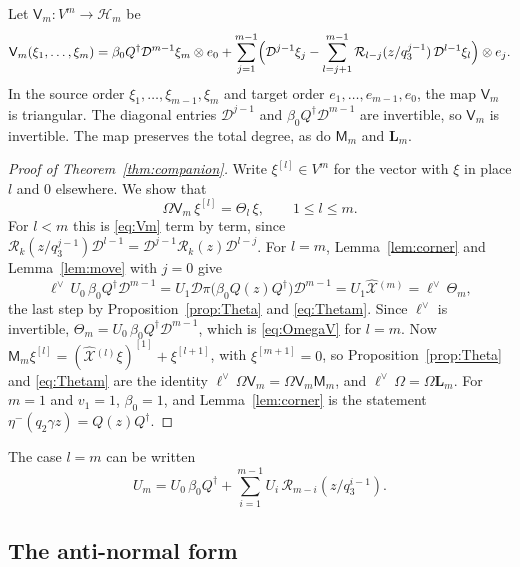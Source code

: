 \documentclass[11pt]{amsart}
\theoremstyle{definition}
\theoremstyle{remark}
\newcommand{\betaz}{\beta_0}                     %
\newcommand{\HH}{\mathcal H}
\newcommand{\Hsp}[1]{\HH_{#1}}                   %
\newcommand{\auxe}[1]{e_{#1}}                    %
\newcommand{\taut}{\ell}                         %
\newcommand{\dtaut}{\taut^{\vee}}                %
\newcommand{\Omap}{\Omega}                       %
\newcommand{\LL}{\mathbf L}
\newcommand{\Lax}[1]{\LL_{#1}}                   %
\newcommand{\DD}{\mathcal D}
\newcommand{\Xhat}[1]{\widehat{\mathcal X}{}^{(#1)}}   %
\newcommand{\MM}{\mathsf M}
\newcommand{\Miura}[1]{\MM_{#1}}                 %
\newcommand{\VV}{\mathsf V}
\newcommand{\Vconj}[1]{\VV_{#1}}                 %
\newcommand{\Rlast}[1]{\mathcal R_{#1}}          %
\newcommand{\Qcr}{Q}                             %
\newcommand{\Qan}{Q^\dagger}                     %
\begin{document}
Let \(\Vconj{m}\colon V^m\to\Hsp{m}\) be
\begin{equation}\label{eq:Vm}
 \Vconj{m}(\xi_1,\dots,\xi_m)=\betaz\Qan\DD^{m-1}\xi_m\otimes\auxe{0}
 +\sum_{j=1}^{m-1}\Bigl(\DD^{j-1}\xi_j-\sum_{l=j+1}^{m-1}
 \Rlast{l-j}(z/q_3^{j-1})\,\DD^{l-1}\xi_l\Bigr)\otimes\auxe{j}.
\end{equation}
In the source order \(\xi_1,\dots,\xi_{m-1},\xi_m\) and target order
\(\auxe{1},\dots,\auxe{m-1},\auxe{0}\), the map \(\Vconj{m}\) is triangular.
The diagonal entries \(\DD^{j-1}\) and \(\betaz\Qan\DD^{m-1}\) are invertible,
so \(\Vconj{m}\) is invertible. The map preserves the total degree, as do
\(\Miura{m}\) and \(\Lax{m}\).

\begin{proof}[Proof of Theorem~\ref{thm:companion}]
Write \(\xi^{[l]}\in V^m\) for the vector with \(\xi\) in place \(l\) and \(0\) elsewhere. We show that
\begin{equation}\label{eq:OmegaV}
 \Omap\Vconj{m}\,\xi^{[l]}=\Theta_l\,\xi,\qquad1\leq l\leq m.
\end{equation}
For \(l<m\) this is \eqref{eq:Vm} term by term, since
\(\Rlast{k}(z/q_3^{j-1})\DD^{l-1}=\DD^{j-1}\Rlast{k}(z)\DD^{l-j}\). For \(l=m\), Lemma~\ref{lem:corner} and
Lemma~\ref{lem:move} with \(j=0\) give
\[
 \dtaut\,U_0\,\betaz\Qan\DD^{m-1}=U_1\DD\pi\bigl(\betaz\Qcr(z)\Qan\bigr)\DD^{m-1}=U_1\Xhat{m}
 =\dtaut\,\Theta_m,
\]
the last step by Proposition~\ref{prop:Theta} and \eqref{eq:Thetam}. Since \(\dtaut\) is invertible,
\(\Theta_m=U_0\,\betaz\Qan\DD^{m-1}\), which is \eqref{eq:OmegaV} for \(l=m\). Now
\(\Miura{m}\xi^{[l]}=(\Xhat{l}\xi)^{[1]}+\xi^{[l+1]}\), with \(\xi^{[m+1]}=0\), so
Proposition~\ref{prop:Theta} and \eqref{eq:Thetam} are the identity
\(\dtaut\,\Omap\Vconj{m}=\Omap\Vconj{m}\Miura{m}\), and \(\dtaut\,\Omap=\Omap\Lax{m}\). For \(m=1\) and
\(v_1=1\), \(\betaz=1\), and Lemma~\ref{lem:corner} is the statement
\(\eta^-(q_2\gamma z)=\Qcr(z)\Qan\).
\end{proof}

The case \(l=m\) can be written
\begin{equation}\label{eq:Um}
 U_m=U_0\,\betaz\Qan+\sum_{i=1}^{m-1}U_i\,\Rlast{m-i}(z/q_3^{i-1}).
\end{equation}

\subsection{The anti-normal form}\label{sec:construction}
\end{document}
